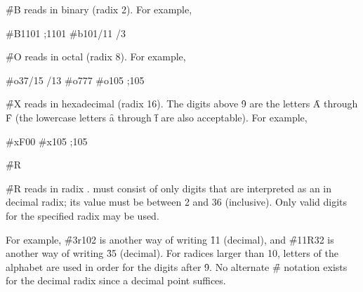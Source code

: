 \endsubsubsection%




\f{\#B} reads  in binary (radix 2).
For example, 

\code
 #B1101  ;1101\ssst
 #b101/11 /3
\endcode

\endsubsubsection%



\f{\#O} reads  in octal (radix 8).
For example, 

\code
 #o37/15 /13
 #o777 
 #o105  ;105\ssse
\endcode

\endsubsubsection%



\f{\#X} reads  in hexadecimal (radix 16).
The digits above \f{9} are the letters \f{A} through \f{F} (the lowercase
letters \f{a} through \f{f} are also acceptable).  For example,

\code
 #xF00              
 #x105  ;105\ssss
\endcode

\endsubsubsection%


\f{\#R}
                                                             
\f{\#R} reads  in radix .
 must consist of only digits
that are interpreted as an 
in decimal radix; its value must be between 2 and 36 (inclusive).
Only valid digits
for the specified radix may be used.

For example, \f{\#3r102} is another way of writing \f{11} (decimal), 
and \f{\#11R32}
is another way of writing \f{35} (decimal).  
For radices larger than 10, letters of
the alphabet are used in order for the digits after \f{9}.
No alternate \f{\#} notation exists for the decimal radix since a
decimal point suffices.


